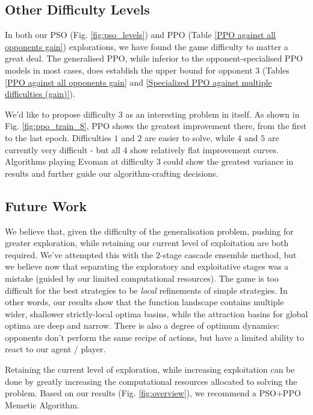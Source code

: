 \documentclass[conference]{IEEEtran}
\begin{document}
    \subsection{Other Difficulty Levels}
    In both our PSO (Fig. \ref{fig:pso_levels}) and PPO (Table \ref{PPO against all opponents gain}) explorations, we have found the game difficulty to matter a great deal. The generalised PPO, while inferior to the opponent-specialised PPO models in most cases, does establish the upper bound for opponent $3$ (Tables \ref{PPO against all opponents gain} and \ref{Specialized PPO against multiple difficulties (gain)}).

    We'd like to propose difficulty $3$ as an interesting problem in itself. As shown in Fig. \ref{fig:ppo_train_8}, PPO shows the greatest improvement there, from the first to the last epoch. Difficulties $1$ and $2$ are  easier to solve, while $4$ and $5$ are currently very difficult - but all $4$ show relatively flat improvement curves. Algorithms playing Evoman at difficulty $3$ could show the greatest variance in results and further guide our algorithm-crafting decisions.

    \subsection{Future Work}

    We believe that, given the difficulty of the generalisation problem, pushing for greater exploration, while retaining our current level of exploitation are both required. We've attempted this with the $2$-stage cascade ensemble method, but we believe now that separating the exploratory and exploitative stages was a mistake (guided by our limited computational resources). The game is too difficult for the best strategies to be \textit{local} refinements of simple strategies. In other words, our results show that the function landscape contains multiple wider, shallower strictly-local optima basins, while the attraction basins for global optima are deep and narrow. There is also a degree of optimum dynamics: opponents don't perform the same recipe of actions, but have a limited ability to react to our agent / player.

    Retaining the current level of exploration, while increasing exploitation can be done by greatly increasing the computational resources allocated to solving the problem\cite{nfl}. Based on our results (Fig. \ref{fig:overview}), we recommend a PSO$+$PPO Memetic Algorithm\cite{memetic}. 
\end{document}
